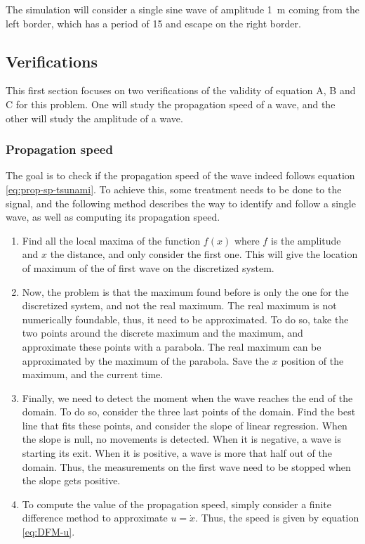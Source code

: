 \documentclass[a4paper,12pt,twoside]{article}
\begin{document}
      The simulation will consider a single sine wave of amplitude \SI{1}{\meter} coming from the left border, which has a period of \SI{15}{\min} and escape on the right border.\\

      \subsection{Verifications}
      This first section focuses on two verifications of the validity of equation A, B and C for this problem.
      One will study the propagation speed of a wave, and the other will study the amplitude of a wave.

      \subsubsection{Propagation speed}
        The goal is to check if the propagation speed of the wave indeed follows equation \eqref{eq:prop-sp-tsunami}.
        To achieve this, some treatment needs to be done to the signal, and the following method describes the way to identify and follow a single wave, as well as computing its propagation speed.
        \begin{enumerate}
          \item Find all the local maxima of the function $f(x)$ where $f$ is the amplitude and $x$ the distance, and only consider the first one.
          This will give the location of maximum of the of first wave on the discretized system.
          \item Now, the problem is that the maximum found before is only the one for the discretized system, and not the real maximum.
          The real maximum is not numerically foundable, thus, it need to be approximated.
          To do so, take the two points around the discrete maximum and the maximum, and approximate these points with a parabola.
          The real maximum can be approximated by the maximum of the parabola.
          Save the $x$ position of the maximum, and the current time.
          \item Finally, we need to detect the moment when the wave reaches the end of the domain.
          To do so, consider the three last points of the domain.
          Find the best line that fits these points, and consider the slope of linear regression.
          When the slope is null, no movements is detected.
          When it is negative, a wave is starting its exit.
          When it is positive, a wave is more that half out of the domain.
          Thus, the measurements on the first wave need to be stopped when the slope gets positive.
          \item To compute the value of the propagation speed, simply consider a finite difference method to approximate $u=\dot{x}$.
          Thus, the speed is given by equation \eqref{eq:DFM-u}.
        \end{enumerate}
\end{document}
